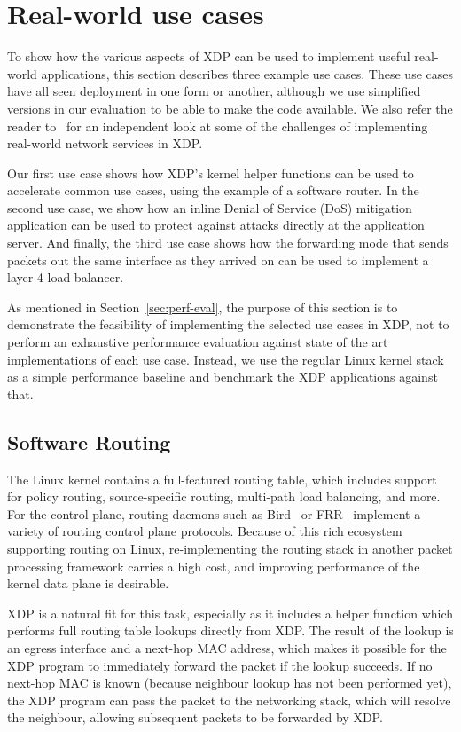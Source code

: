 \documentclass[sigconf]{acmart}
\begin{document}
\section{Real-world use cases}
\label{sec:usecases}
To show how the various aspects of XDP can be used to implement useful
real-world applications, this section describes three example use cases. These
use cases have all seen deployment in one form or another, although we use
simplified versions in our evaluation to be able to make the code available. We
also refer the reader to~\cite{miano2018creating} for an independent look at
some of the challenges of implementing real-world network services in XDP.

Our first use case shows how XDP's kernel helper functions can be used to
accelerate common use cases, using the example of a software router. In the
second use case, we show how an inline Denial of Service (DoS) mitigation
application can be used to protect against attacks directly at the application
server. And finally, the third use case shows how the forwarding mode that sends
packets out the same interface as they arrived on can be used to implement a
layer-4 load balancer.

As mentioned in Section~\ref{sec:perf-eval}, the purpose of this section is to
demonstrate the feasibility of implementing the selected use cases in XDP, not
to perform an exhaustive performance evaluation against state of the art
implementations of each use case. Instead, we use the regular Linux kernel stack
as a simple performance baseline and benchmark the XDP applications against
that.

\subsection{Software Routing}
\label{sec:fwd-usecase}
The Linux kernel contains a full-featured routing table, which includes support
for policy routing, source-specific routing, multi-path load balancing, and more.
For the control plane, routing daemons such as Bird~\cite{bird} or
FRR~\cite{frr} implement a variety of routing control plane protocols. Because
of this rich ecosystem supporting routing on Linux, re-implementing the routing
stack in another packet processing framework carries a high cost, and improving
performance of the kernel data plane is desirable.

XDP is a natural fit for this task, especially as it includes a helper function
which performs full routing table lookups directly from XDP. The result of the
lookup is an egress interface and a next-hop MAC address, which makes it
possible for the XDP program to immediately forward the packet if the lookup
succeeds. If no next-hop MAC is known (because neighbour lookup has not been
performed yet), the XDP program can pass the packet to the networking stack,
which will resolve the neighbour, allowing subsequent packets to be forwarded by
XDP.
\end{document}
